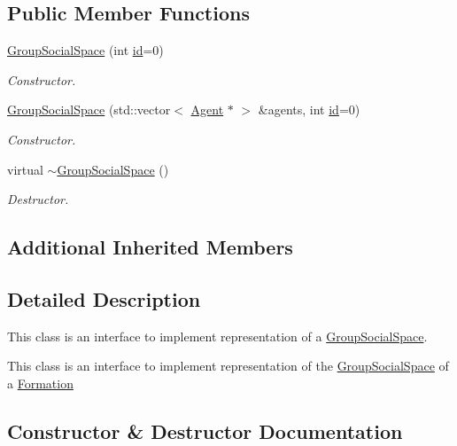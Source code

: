 \subsection*{Public Member Functions}
\begin{DoxyCompactItemize}
\item 
\hyperlink{classGroupSocialSpace_af1f690cd933fb5d6272c68e6a0551efa}{Group\+Social\+Space} (int \hyperlink{classIdentifiedObject_ad044a317a9b573a3d1bcd025df166eb5}{id}=0)
\begin{DoxyCompactList}\small\item\em Constructor. \end{DoxyCompactList}\item 
\hyperlink{classGroupSocialSpace_a30f027f4d6ac7c0d0645240cf093d220}{Group\+Social\+Space} (std\+::vector$<$ \hyperlink{classAgent}{Agent} $\ast$ $>$ \&agents, int \hyperlink{classIdentifiedObject_ad044a317a9b573a3d1bcd025df166eb5}{id}=0)
\begin{DoxyCompactList}\small\item\em Constructor. \end{DoxyCompactList}\item 
virtual \hyperlink{classGroupSocialSpace_add59c0e23f9ab6190ca3bf895d754520}{$\sim$\+Group\+Social\+Space} ()
\begin{DoxyCompactList}\small\item\em Destructor. \end{DoxyCompactList}\end{DoxyCompactItemize}
\subsection*{Additional Inherited Members}


\subsection{Detailed Description}
This class is an interface to implement representation of a \hyperlink{classGroupSocialSpace}{Group\+Social\+Space}. 

This class is an interface to implement representation of the \hyperlink{classGroupSocialSpace}{Group\+Social\+Space} of a \hyperlink{classFormation}{Formation} 

\subsection{Constructor \& Destructor Documentation}
